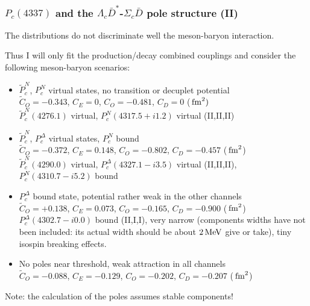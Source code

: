 \documentclass[utf8,10pt]{beamer}
\begin{document}
\begin{frame}
\frametitle{$P_{c}(4337)$ and the $\Lambda_c \bar{D}^*$-$\Sigma_c \bar{D}$ pole structure (II)}

The distributions do not discriminate well the meson-baryon interaction. 

\vspace{0.15cm}
Thus I will only fit the production/decay combined couplings and
consider the following meson-baryon scenarios:

\begin{itemize}
\item[(a)] $\tilde{P}_c^N$, ${P}_c^N$ virtual states, no transition or decuplet potential \\
  {\scriptsize $\tilde{C}_O = -0.343$, $C_E = 0$, $C_O = -0.481$, $C_D = 0$ ($\,{\rm fm}^2)$ \\
    $\tilde{P}_c^N(4276.1)$ virtual,
    ${P}_c^N(4317.5 + i 1.2)$ virtual (II,II,II)}

\item[(b)] $\tilde{P}_c^N$, ${P}_c^{\Delta}$ virtual states, $P_c^N$ bound \\
  {\scriptsize $\tilde{C}_O = -0.372$, $C_E = 0.148$,
    $C_O = -0.802$, $C_D = -0.457$ ($\,{\rm fm}^2$)\\
    $\tilde{P}_c^N(4290.0)$ virtual, ${P}_c^{\Delta}(4327.1 - i 3.5)$ virtual (II,II,II), $P_c^{N}(4310.7 - i 5.2)$ bound}

\item[(c)] ${P}_c^{\Delta}$ bound state, potential rather weak
  in the other channels \\
  {\scriptsize $\tilde{C}_O = +0.138$, $C_E = 0.073$,
    $C_O = -0.165$, $C_D = -0.900$ ($\,{\rm fm}^2$)\\
    ${P}_c^{\Delta}(4302.7 - i 0.0)$ bound (II,I,I), very narrow (components
    widths have not been included: its actual width should be about
    $2\,{\rm MeV}$ give or take), tiny isospin breaking effects.}

\item[(d)] No poles near threshold, weak attraction in all channels \\
    {\scriptsize $\tilde{C}_O = -0.088$, $C_E = -0.129$,
    $C_O = -0.202$, $C_D = -0.207$ ($\,{\rm fm}^2$)}
\end{itemize}

Note: the calculation of the poles assumes stable components!

\end{frame}
\end{document}
